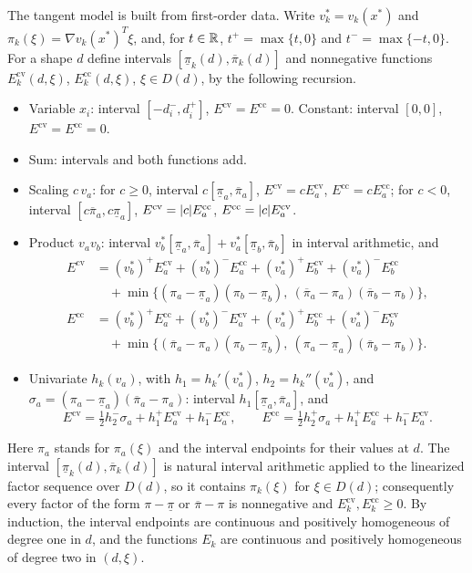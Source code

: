 The tangent model is built from first-order data. Write $v_k^*=v_k(x^*)$
and $\pi_k(\xi)=\nabla v_k(x^*)^T\xi$, and, for $t\in\mathbb{R}$,
$t^+=\max\{t,0\}$ and $t^-=\max\{-t,0\}$. For a shape $d$ define intervals
$[\underline\pi_k(d),\overline\pi_k(d)]$ and nonnegative functions
$E_k^{\mathrm{cv}}(d,\xi)$, $E_k^{\mathrm{cc}}(d,\xi)$, $\xi\in D(d)$, by the
following recursion.
\begin{itemize}
\item Variable $x_i$: interval $[-d_i^-,d_i^+]$, $E^{\mathrm{cv}}=E^{\mathrm{cc}}=0$.
  Constant: interval $[0,0]$, $E^{\mathrm{cv}}=E^{\mathrm{cc}}=0$.
\item Sum: intervals and both functions add.
\item Scaling $c\,v_a$: for $c\ge0$, interval $c[\underline\pi_a,\overline\pi_a]$,
  $E^{\mathrm{cv}}=cE_a^{\mathrm{cv}}$, $E^{\mathrm{cc}}=cE_a^{\mathrm{cc}}$; for
  $c<0$, interval $[c\overline\pi_a,c\underline\pi_a]$,
  $E^{\mathrm{cv}}=\lvert c\rvert E_a^{\mathrm{cc}}$, $E^{\mathrm{cc}}=\lvert c\rvert E_a^{\mathrm{cv}}$.
\item Product $v_av_b$: interval
  $v_b^*[\underline\pi_a,\overline\pi_a]+v_a^*[\underline\pi_b,\overline\pi_b]$
  in interval arithmetic, and
  \begin{align*}
    E^{\mathrm{cv}}&=(v_b^*)^+E_a^{\mathrm{cv}}+(v_b^*)^-E_a^{\mathrm{cc}}
      +(v_a^*)^+E_b^{\mathrm{cv}}+(v_a^*)^-E_b^{\mathrm{cc}}\\
      &\quad+\min\bigl\{(\pi_a-\underline\pi_a)(\pi_b-\underline\pi_b),\
      (\overline\pi_a-\pi_a)(\overline\pi_b-\pi_b)\bigr\},\\
    E^{\mathrm{cc}}&=(v_b^*)^+E_a^{\mathrm{cc}}+(v_b^*)^-E_a^{\mathrm{cv}}
      +(v_a^*)^+E_b^{\mathrm{cc}}+(v_a^*)^-E_b^{\mathrm{cv}}\\
      &\quad+\min\bigl\{(\overline\pi_a-\pi_a)(\pi_b-\underline\pi_b),\
      (\pi_a-\underline\pi_a)(\overline\pi_b-\pi_b)\bigr\}.
  \end{align*}
\item Univariate $h_k(v_a)$, with $h_1=h_k'(v_a^*)$, $h_2=h_k''(v_a^*)$, and
  $\sigma_a=(\pi_a-\underline\pi_a)(\overline\pi_a-\pi_a)$: interval
  $h_1[\underline\pi_a,\overline\pi_a]$, and
  \[
    E^{\mathrm{cv}}=\tfrac12h_2^-\sigma_a+h_1^+E_a^{\mathrm{cv}}+h_1^-E_a^{\mathrm{cc}},\qquad
    E^{\mathrm{cc}}=\tfrac12h_2^+\sigma_a+h_1^+E_a^{\mathrm{cc}}+h_1^-E_a^{\mathrm{cv}}.
  \]
\end{itemize}
Here $\pi_a$ stands for $\pi_a(\xi)$ and the interval endpoints for their
values at $d$. The interval $[\underline\pi_k(d),\overline\pi_k(d)]$ is
natural interval arithmetic applied to the linearized factor sequence over
$D(d)$, so it contains $\pi_k(\xi)$ for $\xi\in D(d)$; consequently every
factor of the form $\pi-\underline\pi$ or $\overline\pi-\pi$ is nonnegative
and $E_k^{\mathrm{cv}},E_k^{\mathrm{cc}}\ge0$. By induction, the interval
endpoints are continuous and positively homogeneous of degree one in $d$,
and the functions $E_k$ are continuous and positively homogeneous of degree
two in $(d,\xi)$.

